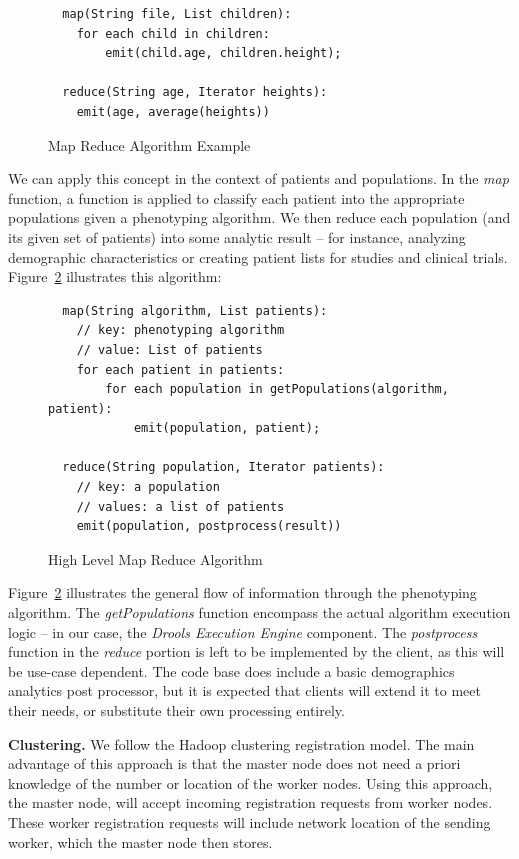 \documentclass{amia}
\begin{document}
\begin{figure}[H]
\begin{verbatim}
  map(String file, List children):
    for each child in children:
    	emit(child.age, children.height);

  reduce(String age, Iterator heights):
    emit(age, average(heights))
\end{verbatim}
\caption{Map Reduce Algorithm Example} 
\label{fig:map_reduce_example}
\end{figure}

We can apply this concept in the context of patients and populations. In the \textit{map} function, a function is applied to classify each patient into the appropriate populations given a phenotyping algorithm. We then reduce each population (and its given set of patients) into some analytic result -- for instance, analyzing demographic characteristics or creating patient lists for studies and clinical trials. Figure~\ref{fig:map_reduce_htp} illustrates this algorithm:

\begin{figure}[H]
\begin{verbatim}
  map(String algorithm, List patients):
    // key: phenotyping algorithm
    // value: List of patients
    for each patient in patients:
        for each population in getPopulations(algorithm, patient):
            emit(population, patient);

  reduce(String population, Iterator patients):
    // key: a population
    // values: a list of patients
    emit(population, postprocess(result))
\end{verbatim}
\caption{High Level Map Reduce Algorithm} 
\label{fig:map_reduce_htp}
\end{figure}

Figure~\ref{fig:map_reduce_htp} illustrates the general flow of information through the phenotyping algorithm. The \textit{getPopulations} function encompass the actual algorithm execution logic -- in our case, the \textit{Drools Execution Engine} component. The \textit{postprocess} function in the \textit{reduce} portion is left to be implemented by the client, as this will be use-case dependent. The code base does include a basic demographics analytics post processor, but it is expected that clients will extend it to meet their needs, or substitute their own processing entirely.

\textbf{Clustering.}
We follow the Hadoop clustering registration model\cite{wang2009hadoop}. The main advantage of this approach is that the master node does not need a priori knowledge of the number or location of the worker nodes. Using this approach, the master node, will accept incoming registration requests from worker nodes. These worker registration requests will include network location of the sending worker, which the master node then stores.
\end{document}
